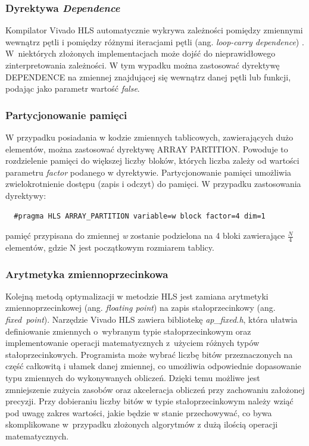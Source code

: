 \subsubsection{Dyrektywa \emph{Dependence}}

Kompilator Vivado HLS automatycznie wykrywa zależności pomiędzy zmiennymi wewnątrz pętli i pomiędzy różnymi iteracjami pętli (ang. \emph{loop-carry dependence}) \cite{hls-pragmas}. W~niektórych złożonych implementacjach może dojść do nieprawidłowego zinterpretowania zależności. W tym wypadku można zastosować dyrektywę DEPENDENCE na zmiennej znajdującej się wewnątrz danej pętli lub funkcji, podając jako parametr wartość \emph{false}.

\subsubsection{Partycjonowanie pamięci}

W przypadku posiadania w kodzie zmiennych tablicowych, zawierających dużo elementów, można zastosować dyrektywę ARRAY PARTITION. Powoduje to rozdzielenie pamięci do większej liczby bloków, których liczba zależy od wartości parametru \emph{factor} podanego w dyrektywie. Partycjonowanie pamięci umożliwia zwielokrotnienie dostępu (zapis i odczyt) do pamięci. W przypadku zastosowania dyrektywy:
\begin{verbatim}
  #pragma HLS ARRAY_PARTITION variable=w block factor=4 dim=1
\end{verbatim}
pamięć przypisana do zmiennej \emph{w} zostanie podzielona na 4 bloki zawierające $\frac{N}{4}$ elementów, gdzie N jest początkowym rozmiarem tablicy. 

\subsubsection{Arytmetyka zmiennoprzecinkowa}

Kolejną metodą optymalizacji w metodzie HLS jest zamiana arytmetyki zmiennoprzecinkowej (ang. \emph{floating point}) na zapis 
stałoprzecinkowy (ang. \emph{fixed\ point}). Narzędzie Vivado HLS zawiera bibliotekę \emph{ap\_fixed.h}, która ułatwia 
definiowanie zmiennych o~wybranym typie stałoprzecinkowym oraz implementowanie operacji matematycznych z~użyciem różnych 
typów stałoprzecinkowych. Programista może wybrać liczbę bitów przeznaczonych na część całkowitą i ułamek danej zmiennej, co umożliwia odpowiednie dopasowanie typu zmiennych do wykonywanych obliczeń. Dzięki temu możliwe jest zmniejszenie zużycia zasobów oraz akceleracja obliczeń przy zachowaniu założonej precyzji. Przy dobieraniu liczby bitów w typie stałoprzecinkowym należy wziąć pod uwagę zakres wartości, jakie będzie w stanie przechowywać, co bywa skomplikowane w~przypadku złożonych algorytmów z dużą ilością operacji matematycznych. 


